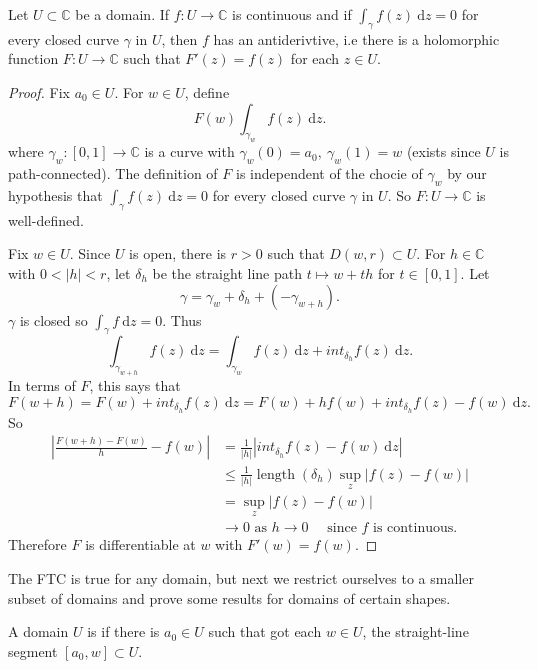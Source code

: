 \documentclass[egregdoesnotlikesansseriftitles,a4paper]{scrartcl}
\begin{document}
\begin{theorem}\label{ftcconverse}
      Let $U \subset \mathbb{C}$ be a domain. If $f: U \rightarrow \mathbb{C}$ is continuous and if $\int_{\gamma}^{}f (z) \ \mathrm{d}z =0$ for every closed curve $\gamma$ in $U$, then $f$ has an antiderivtive, i.e there is a holomorphic function $F: U \rightarrow \mathbb{C}$ such that $F' (z)=f (z)$ for each $z \in U$.
\end{theorem}
\begin{proof}
      Fix $a_0 \in U$. For $w \in U$, define \[
      F (w) \int_{\gamma_{w}}^{}f (z) \ \mathrm{d}z 
      .\] where $\gamma_{w}: [0,1] \rightarrow \mathbb{C}$ is a curve with $\gamma_{w} (0)=a_0 , \ \gamma_{w}(1)=w$ (exists since $U$ is path-connected). The definition of $F$ is independent of the chocie of $\gamma_{w}$ by our hypothesis that $\int_{\gamma}^{}f (z) \ \mathrm{d}z =0$ for every closed curve $\gamma$ in $U$. So $F: U \rightarrow \mathbb{C}$ is well-defined.

      Fix $w \in U$. Since $U$ is open, there is $r>0$ such that $D (w,r) \subset  U$. For $h \in \mathbb{C}$ with $0 < |h|<r$, let $\delta_{h}$ be the straight line path $t \mapsto w+th$ for $t \in [0,1]$. Let \[
      \gamma= \gamma_{w}+\delta_{h}+ (-\gamma_{w+h})
      .\] $\gamma$ is closed so $\int_{\gamma}^{}f \ \mathrm{d}z=0 $. Thus \[
      \int_{\gamma_{w+h}}^{}f (z) \ \mathrm{d}z =\int_{\gamma_{w}}^{}f (z) \ \mathrm{d}z +int_{\delta_{h}}^{}f (z) \ \mathrm{d}z 
      .\] In terms of $F$, this says that \[
     F (w+h)=F (w)+int_{\delta_{h}}^{}f (z) \ \mathrm{d}z =F (w)+ h f (w)+int_{\delta_{h}}^{}f (z)-f (w) \ \mathrm{d}z 
      .\] So 
      \begin{align*}
           \left| \frac{F (w+h)-F (w)}{h}- f (w)\right| &= \frac{1}{|h|}|int_{\delta_{h}}^{}f (z)-f (w) \ \mathrm{d}z |\\
           &\leq \frac{1}{|h|}\operatorname{length}(\delta_{h})\sup_{z}|f (z)-f (w)|\\
           &=\sup_{z}|f (z)-f (w)|\\
           & \rightarrow 0 \text{ as } h \rightarrow 0 \quad \text{ since } f \text{ is continuous.}
      \end{align*}
      Therefore $F$ is differentiable at $w$ with $F' (w)=f (w)$.
\end{proof}
The FTC is true for any domain, but next we restrict ourselves to a smaller subset of domains and prove some results for domains of certain shapes.
\begin{definition*}
      A domain $U$ is  if there is $a_0 \in U$ such that got each $w \in U$, the straight-line segment $[a_0 ,w] \subset U$.
\end{definition*}
\end{document}
